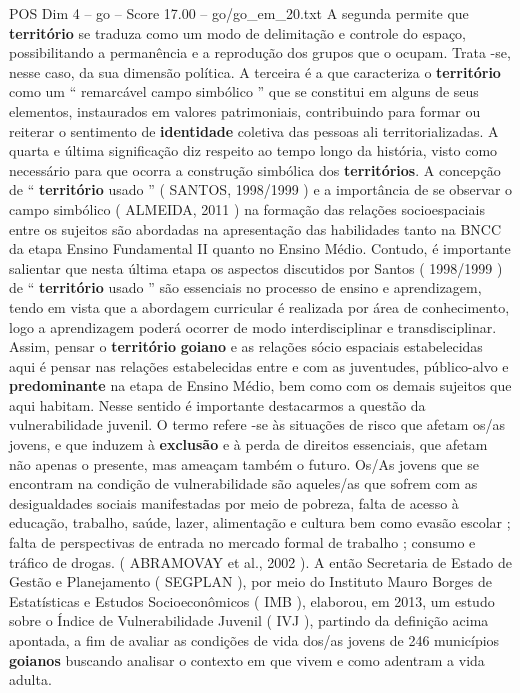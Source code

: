 \begin{textsample}{POS Dim 4 – go – Score 17.00 – go/go\_em\_20.txt}
A segunda permite que \textbf{território} se traduza como um modo de delimitação e controle do espaço, possibilitando a permanência e a reprodução dos grupos que o ocupam.
Trata -se, nesse caso, da sua dimensão política.
A terceira é a que caracteriza o \textbf{território} como um “ remarcável campo simbólico ” que se constitui em alguns de seus elementos, instaurados em valores patrimoniais, contribuindo para formar ou reiterar o sentimento de \textbf{identidade} coletiva das pessoas ali territorializadas.
A quarta e última significação diz respeito ao tempo longo da história, visto como necessário para que ocorra a construção simbólica dos \textbf{territórios}.
A concepção de “ \textbf{território} usado ” ( SANTOS, 1998/1999 ) e a importância de se observar o campo simbólico ( ALMEIDA, 2011 ) na formação das relações socioespaciais entre os sujeitos são abordadas na apresentação das habilidades tanto na BNCC da etapa Ensino Fundamental II quanto no Ensino Médio.
Contudo, é importante salientar que nesta última etapa os aspectos discutidos por Santos ( 1998/1999 ) de “ \textbf{território} usado ” são essenciais no processo de ensino e aprendizagem, tendo em vista que a abordagem curricular é realizada por área de conhecimento, logo a aprendizagem poderá ocorrer de modo interdisciplinar e transdisciplinar.
Assim, pensar o \textbf{território} \textbf{goiano} e as relações sócio espaciais estabelecidas aqui é pensar nas relações estabelecidas entre e com as juventudes, público-alvo e \textbf{predominante} na etapa de Ensino Médio, bem como com os demais sujeitos que aqui habitam.
Nesse sentido é importante destacarmos a questão da vulnerabilidade juvenil.
O termo refere -se às situações de risco que afetam os/as jovens, e que induzem à \textbf{exclusão} e à perda de direitos essenciais, que afetam não apenas o presente, mas ameaçam também o futuro.
Os/As jovens que se encontram na condição de vulnerabilidade são aqueles/as que sofrem com as desigualdades sociais manifestadas por meio de pobreza, falta de acesso à educação, trabalho, saúde, lazer, alimentação e cultura bem como evasão escolar ; falta de perspectivas de entrada no mercado formal de trabalho ; consumo e tráfico de drogas. ( ABRAMOVAY et al., 2002 ).
A então Secretaria de Estado de Gestão e Planejamento ( SEGPLAN ), por meio do Instituto Mauro Borges de Estatísticas e Estudos Socioeconômicos ( IMB ), elaborou, em 2013, um estudo sobre o Índice de Vulnerabilidade Juvenil ( IVJ ), partindo da definição acima apontada, a fim de avaliar as condições de vida dos/as jovens de 246 municípios \textbf{goianos} buscando analisar o contexto em que vivem e como adentram a vida adulta.

\end{textsample}
